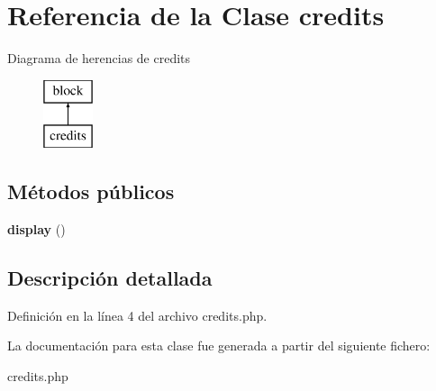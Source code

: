 \hypertarget{classcredits}{\section{\-Referencia de la \-Clase credits}
\label{classcredits}
}
\-Diagrama de herencias de credits\begin{figure}[H]
\begin{center}
\leavevmode
\includegraphics[height=2.000000cm]{classcredits}
\end{center}
\end{figure}
\subsection*{\-Métodos públicos}
\begin{DoxyCompactItemize}
\item 
\hypertarget{classcredits_aed4f2bfc57e15cd9e2749ff7411a9be6}{{\bfseries display} ()}\label{classcredits_aed4f2bfc57e15cd9e2749ff7411a9be6}

\end{DoxyCompactItemize}


\subsection{\-Descripción detallada}


\-Definición en la línea 4 del archivo credits.\-php.



\-La documentación para esta clase fue generada a partir del siguiente fichero\-:\begin{DoxyCompactItemize}
\item 
credits.\-php\end{DoxyCompactItemize}
